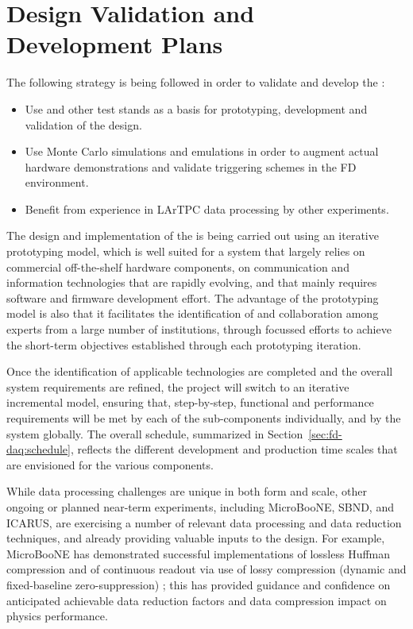 \section{Design Validation and Development Plans}
\label{sec:fd-daq:validation}

The following strategy is being followed in order to validate and
develop the   :
\begin{itemize}
\item Use  and other test stands as a basis for prototyping, development and validation
of the  design.
\item Use Monte Carlo simulations and emulations in order to augment actual hardware
demonstrations and validate triggering schemes in the FD environment.
\item Benefit from experience in LArTPC data processing by other experiments.
\end{itemize}


The design and implementation of the  is being carried out using an iterative prototyping model, which is well suited for a system that largely relies on commercial off-the-shelf hardware components, on communication and information technologies that are rapidly evolving, and that mainly requires software and firmware development effort.
The advantage of the prototyping model is also that it facilitates the identification of and collaboration among experts from a large number of institutions, through focussed efforts to achieve the short-term objectives established through each prototyping iteration.

Once the identification of applicable technologies are completed and the overall system requirements are refined, the project will switch to an iterative incremental model, ensuring that, step-by-step, functional and performance requirements will be met by each of the sub-components individually, and by the  system globally.
The overall schedule, summarized in Section~\ref{sec:fd-daq:schedule},
reflects the different development and production time scales that are
envisioned for the various  components.

While  data processing challenges are unique in both form
and scale, other ongoing or planned near-term 
experiments, including MicroBooNE, SBND, and ICARUS, are exercising
a number of relevant data processing and data reduction techniques, and already providing valuable
inputs to the    design. For example,
MicroBooNE has demonstrated successful implementations of lossless Huffman
compression and of continuous readout via use of lossy compression
(dynamic and fixed-baseline zero-suppression)
\cite{bib:uBsnreadout2019}; this has provided guidance and 
confidence on anticipated achievable data reduction factors and data compression
impact on physics performance.

